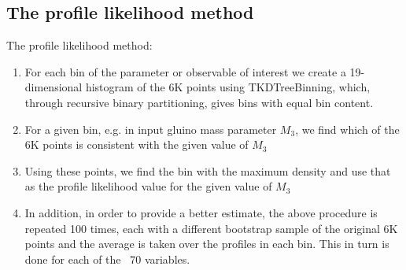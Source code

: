 \subsection{The profile likelihood method}

The profile likelihood method:
\begin{enumerate}
\item For each bin of the parameter or observable of interest we create a 19-dimensional histogram of the 6K points using TKDTreeBinning, which, through recursive binary partitioning, gives bins with equal bin content.
\item For a given bin, e.g. in input gluino mass parameter $M_3$, we find which of the 6K points is consistent with the given value of $M_3$ 
\item Using these points, we find the bin with the maximum density and use that as the profile likelihood value for the given value of $M_3$ 
\item In addition, in order to provide a better estimate, the above procedure is repeated 100 times, each with a different bootstrap sample of the original 6K points and the average is taken over the profiles in each bin. This in turn is done for each of the ~70 variables.
\end{enumerate}


